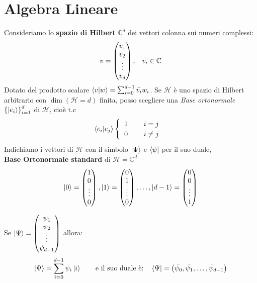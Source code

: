 \documentclass{report}
\begin{document}
\section{Algebra Lineare}
Consideriamo lo \textbf{spazio di Hilbert} $\mathbb{C}^d$ dei vettori colonna sui numeri complessi:
$$
v =
\begin{pmatrix}
  v_1 \\
  v_2 \\
  \vdots \\
  v_d
\end{pmatrix},
\hspace{0.3cm} v_i \in \mathbb{C}
$$
Dotato del prodotto scalare $\braket{v|w} = \sum^{d-1}_{i=0}\bar{v_i}w_i$.
Se $\mathcal{H}$ è uno spazio di Hilbert arbitrario con $\dim(\mathcal{H} = d)$ finita, posso scegliere una \textit{Base ortonormale} $\left\{ \ket{e_i} \right\}^d_{i=1}$ di $\mathcal{H}$, cioè t.c
$$\braket{e_i|e_j} 
\begin{cases}
 \hspace{0.2cm}1 \hspace{0.8cm} i=j \\
 \hspace{0.2cm}0 \hspace{0.8cm} i\neq j
\end{cases}
$$
Indichiamo i vettori di $\mathcal{H}$ con il simbolo $\ket{\Psi}$ e $\bra{\psi}$ per il suo duale,\\
\textbf{Base Ortonormale standard} di $\mathcal{H} = \mathbb{C}^d$
$$
\ket{0}=
\begin{pmatrix}
    1 \\
    0 \\
    \vdots \\
    0
\end{pmatrix}, 
\ket{1}=
\begin{pmatrix}
    0 \\
    1 \\
    \vdots \\
    0
\end{pmatrix}, \dots,
\ket{d-1}=
\begin{pmatrix}
    0 \\
    0 \\
    \vdots \\
    1
\end{pmatrix}
$$

Se $\ket{\Psi} = 
\begin{pmatrix}
    \psi_1 \\
    \psi_2 \\
    \vdots \\
    \psi_{d-1}
\end{pmatrix}
$
allora: $$\ket{\Psi} = \sum^{d-1}_{i=0}\psi_i \ket{i} \qquad\text{e il suo duale è:}\quad \bra{\Psi} = \left(\bar{\psi_0},\bar{\psi_1},\dots,\bar{\psi}_{d-1} \right)$$
\end{document}
